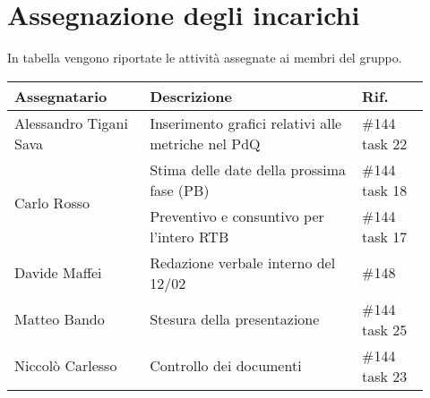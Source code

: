 \section{Assegnazione degli incarichi}
In tabella vengono riportate le attività assegnate ai membri del gruppo.
\begin{center}
	{
		\renewcommand{\arraystretch}{1.5}
		\begin{tabular}{p{0.30\linewidth}|p{0.47\linewidth}|p{0.15\linewidth}}
			\textbf{Assegnatario}             	& \textbf{Descrizione}								& \textbf{Rif.} \\

			\hline
			Alessandro Tigani Sava            & Inserimento grafici relativi alle metriche nel PdQ	& \#144 task 22	\\
			\hline
			\multirow{2}{*}{Carlo Rosso}    &  Stima delle date della prossima fase (PB)			& \#144 task 18	\\
			\cline{2-3}
			                                  & Preventivo e consuntivo per l'intero RTB 			& \#144 task 17    \\
			\hline
			Davide Maffei            			& Redazione verbale interno del 12/02				& \#148	\\
			\hline
			Matteo Bando            & Stesura della presentazione	& \#144 task 25	\\
			\hline
			 Niccolò Carlesso            & Controllo dei documenti	& \#144 task 23	\\
			\hline
		\end{tabular}
	}
\end{center}
